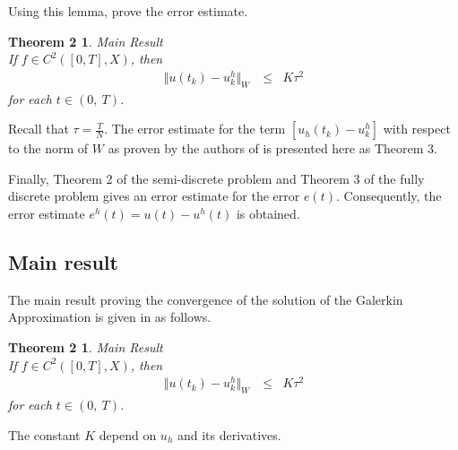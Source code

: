 \documentclass[../../main.tex]{subfiles}
\begin{document}
Using this lemma, \cite{BV13} prove the error estimate.

\newtheorem*{DC_Thm5_1}{Theorem 2}
\begin{DC_Thm5_1}
	{Main Result}\\
	If $f\in C^{2}([0,T],X)$, then
	\begin{eqnarray*}
		\Vert u(t_{k})-u_{k}^{h}\Vert_{W}\ & \leq & K\tau^2
	\end{eqnarray*}
	for each $t\in(0,\ T)$.
\end{DC_Thm5_1}

Recall that $\displaystyle \tau = \frac{T}{N}$. The error estimate for the term
$[u_h(t_k) - u^h_k]$ with respect to the norm of $W$ as proven by the authors
of \cite{BV13} is presented here as Theorem 3.

Finally, Theorem 2 of the semi-discrete problem and Theorem 3 of the fully
discrete problem gives an error estimate for the error $e(t)$. Consequently,
the error estimate $e^h(t) = u(t) - u^h(t)$ is obtained.

\subsection{Main result}
The main result proving the convergence of the solution of the Galerkin
Approximation is given in \cite{BV13} as follows.
\newtheorem*{DC_Thm5}{Theorem 2}
\begin{DC_Thm5}
	{Main Result}\\
	If $f\in C^{2}([0,T],X)$, then
	\begin{eqnarray*}
		\Vert u(t_{k})-u_{k}^{h}\Vert_{W}\ & \leq & K\tau^2
	\end{eqnarray*}
	for each $t\in(0,\ T)$.
\end{DC_Thm5}

The constant $K$ depend on $u_h$ and its derivatives.
\end{document}
